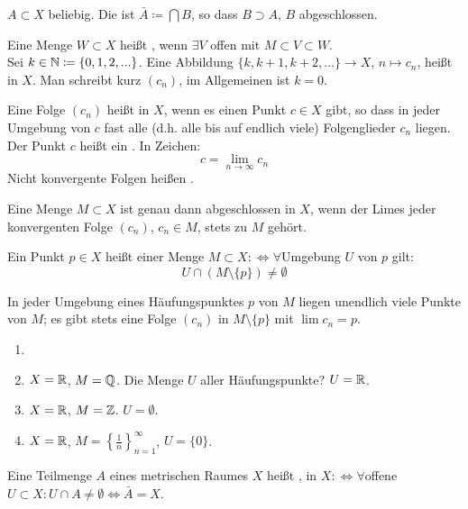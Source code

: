\begin{definition}
$ A\subset X $ beliebig. Die  ist $ \bar A\coloneqq\bigcap B $, so dass $ B\supset A $, $ B $ abgeschlossen. 
\end{definition}
Eine Menge $ W\subset X $ hei\ss t , wenn $ \exists V $ offen mit $ M\subset V\subset W $.\\
Sei $ k\in\mathbb{N}\coloneqq\lbrace 0,1,2,...\rbrace $. Eine Abbildung $ \lbrace k,k+1,k+2,...\rbrace\rightarrow X $, $ n\mapsto c_n $, hei\ss t  in $ X $. Man schreibt kurz $ (c_n) $, im Allgemeinen ist $ k=0 $.\\
\begin{definition}
Eine Folge $ (c_n) $ hei\ss t  in $ X $, wenn es einen Punkt $ c\in X $ gibt, so dass in jeder Umgebung von $ c $ fast alle (d.h. alle bis auf endlich viele) Folgenglieder $ c_n $ liegen. Der Punkt $ c $ hei\ss t ein . In Zeichen:
\[ c=\lim_{n\to\infty}c_n \]
Nicht konvergente Folgen hei\ss en . 
\end{definition}
Eine Menge $ M\subset X $ ist genau dann abgeschlossen in $ X $, wenn der Limes jeder konvergenten Folge $ (c_n) $, $ c_n\in M $, stets zu $ M $ geh\"ort.\\
\begin{definition}
Ein Punkt $ p\in X $ hei\ss t  einer Menge $ M\subset X :\Leftrightarrow\forall $Umgebung $ U $ von $ p $ gilt:
\[ U\cap (M\setminus\lbrace p\rbrace)\neq\emptyset \]
\end{definition}
In jeder Umgebung eines H\"aufungspunktes $ p $ von $ M $ liegen unendlich viele Punkte von $ M $; es gibt stets eine Folge $ (c_n) $ in $ M\setminus\lbrace p\rbrace $ mit $ \lim c_n=p $.
\newpage
\begin{beispiel*}
\begin{enumerate}
\item[]
\item $ X=\mathbb{R} $, $ M=\mathbb{Q} $. Die Menge $ U $ aller H\"aufungspunkte? $ U=\mathbb{R} $.
\item $ X=\mathbb{R} $, $ M=\mathbb{Z} $. $ U = \emptyset $.
\item $ X=\mathbb{R} $, $ M=\left\lbrace\frac{1}{n}\right\rbrace_{n=1}^\infty $, $ U=\lbrace 0\rbrace $.
\end{enumerate}
\end{beispiel*}
\begin{definition}
Eine Teilmenge $ A $ eines metrischen Raumes $ X $ hei\ss t , in $ X:\Leftrightarrow\forall $offene $ U\subset X: U\cap A\neq\emptyset \Leftrightarrow\bar A=X$.
\end{definition}
